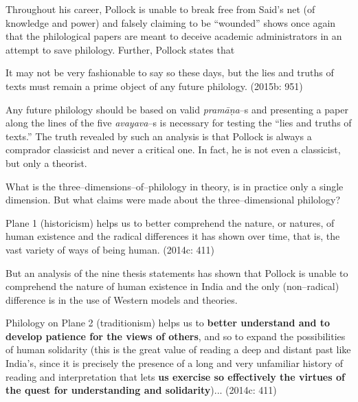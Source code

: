 Throughout his career, Pollock is unable to break free from Said’s net (of knowledge and power) and falsely claiming to be “wounded” shows once again that the philological papers are meant to deceive academic administrators in an attempt to save philology. Further, Pollock states that

\begin{myquote}
It may not be very fashionable to say so these days, but the lies and truths of texts must remain a prime object of any future philology. (2015b: 951)
\end{myquote}

Any future philology should be based on valid\textit{ pramāṇa}–s and presenting a paper along the lines of the five \textit{avayava}–s is necessary for testing the “lies and truths of texts.” The truth revealed by such an analysis is that Pollock is always a comprador classicist and never a critical one. In fact, he is not even a classicist, but only a theorist.

What is the three–dimensions–of–philology in theory, is in practice only a single dimension. But what claims were made about the three–dimensional philology?

\begin{myquote}
Plane 1 (historicism) helps us to better comprehend the nature, or natures, of human existence and the radical differences it has shown over time, that is, the vast variety of ways of being human. (2014c: 411)
\end{myquote}

But an analysis of the nine thesis statements has shown that Pollock is unable to comprehend the nature of human existence in India and the only (non–radical) difference is in the use of Western models and theories.

\begin{myquote}
Philology on Plane 2 (traditionism) helps us to \textbf{better understand and to develop patience for the views of others}, and so to expand the possibilities of human solidarity (this is the great value of reading a deep and distant past like India’s, since it is precisely the presence of a long and very unfamiliar history of reading and interpretation that lets \textbf{us exercise so effectively the virtues of the quest for understanding and solidarity})... (2014c: 411)
\end{myquote}

